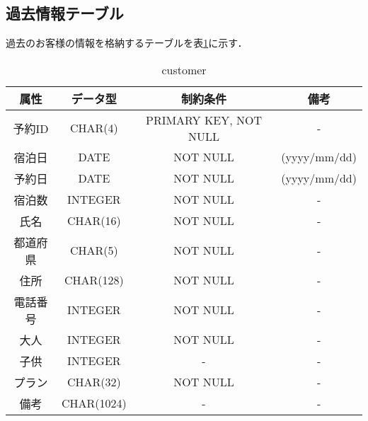 \documentclass[../main]{subfiles}
\begin{document}
\subsection{過去情報テーブル}
過去のお客様の情報を格納するテーブルを表\ref{fig:data_kako}に示す．
\begin{table}[H]
    \begin{center}
    \begin{tabular}{|c|c|c|c|}
        \hline
        属性       & データ型      &  制約条件     & 備考 \\ \hline \hline
        予約ID     & CHAR(4)       & PRIMARY KEY, NOT NULL  &  - \\ \hline
        宿泊日     & DATE          &   NOT NULL   &   (yyyy/mm/dd) \\ \hline
        予約日     & DATE          &   NOT NULL   &   (yyyy/mm/dd) \\ \hline
        宿泊数     & INTEGER       &   NOT NULL    &  - \\ \hline 
        氏名       & CHAR(16)      &   NOT NULL    &  -  \\\hline
        都道府県   & CHAR(5)       &   NOT NULL     & - \\ \hline
        住所       & CHAR(128)     & NOT NULL      & - \\  \hline
        電話番号   & INTEGER       & NOT NULL       & - \\   \hline
        大人       & INTEGER       & NOT NULL       & - \\   \hline
        子供       & INTEGER       & -             & - \\ \hline      
        プラン     & CHAR(32)      & NOT NULL      & - \\  \hline 
        備考       & CHAR(1024)    & -             & -  \\ \hline
        \end{tabular}
        \caption{customer}
        \label{fig:data_kako} 
    \end{center}
    \end{table}
\end{document}
